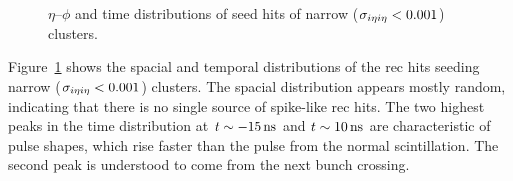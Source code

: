 \begin{figure}[htbp]
  \centering
  \caption{
    $\eta$--$\phi$ and time distributions of seed hits of narrow ($\sigma_{i\eta i\eta} < 0.001$) clusters.
  }
  \label{fig:spike_distributions}
\end{figure}

Figure~\ref{fig:spike_distributions} shows the spacial and temporal distributions of the rec hits seeding narrow ($\sigma_{i\eta i\eta} < 0.001$) clusters. 
The spacial distribution appears mostly random, indicating that there is no single source of spike-like rec hits. 
The two highest peaks in the time distribution at $t \sim -15\, \text{ns}$ and $t \sim 10\, \text{ns}$ are characteristic of pulse shapes, which rise faster than the pulse from the normal scintillation. 
The second peak is understood to come from the next bunch crossing.

